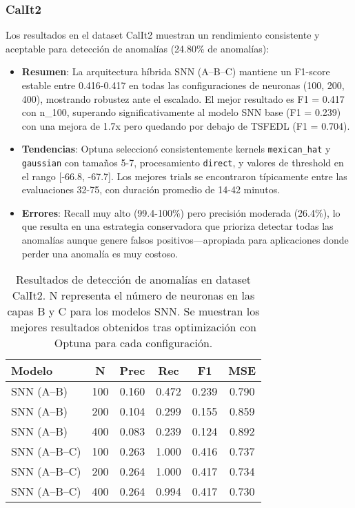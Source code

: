 \subsubsection{CalIt2}
Los resultados en el dataset CalIt2 muestran un rendimiento consistente y aceptable para detección de anomalías (24.80\% de anomalías):
\begin{itemize}
    \item \textbf{Resumen}: La arquitectura híbrida SNN (A--B--C) mantiene un F1-score estable entre 0.416-0.417 en todas las configuraciones de neuronas (100, 200, 400), mostrando robustez ante el escalado. El mejor resultado es F1 = 0.417 con n\_100, superando significativamente al modelo SNN base (F1 = 0.239) con una mejora de 1.7x pero quedando por debajo de TSFEDL (F1 = 0.704).
    \item \textbf{Tendencias}: Optuna seleccionó consistentemente kernels \texttt{mexican\_hat} y \texttt{gaussian} con tamaños 5-7, procesamiento \texttt{direct}, y valores de threshold en el rango [-66.8, -67.7]. Los mejores trials se encontraron típicamente entre las evaluaciones 32-75, con duración promedio de 14-42 minutos.
    \item \textbf{Errores}: Recall muy alto (99.4-100\%) pero precisión moderada (26.4\%), lo que resulta en una estrategia conservadora que prioriza detectar todas las anomalías aunque genere falsos positivos—apropiada para aplicaciones donde perder una anomalía es muy costoso.
\end{itemize}

\begin{table}[htbp]
\centering
\small
\begin{tabular}{lccccc}
\hline\hline
\textbf{Modelo} & \textbf{N} & \textbf{Prec} & \textbf{Rec} & \textbf{F1} & \textbf{MSE} \\
\hline
SNN (A--B) & 100 & 0.160 & 0.472 & 0.239 & 0.790 \\
SNN (A--B) & 200 & 0.104 & 0.299 & 0.155 & 0.859 \\
SNN (A--B) & 400 & 0.083 & 0.239 & 0.124 & 0.892 \\
\hline
SNN (A--B--C) & 100 & 0.263 & 1.000 & 0.416 & 0.737 \\
SNN (A--B--C) & 200 & 0.264 & 1.000 & 0.417 & 0.734 \\
SNN (A--B--C) & 400 & 0.264 & 0.994 & 0.417 & 0.730 \\
\hline\hline
\end{tabular}
\caption{Resultados de detección de anomalías en dataset CalIt2. N representa el número de neuronas en las capas B y C para los modelos SNN. Se muestran los mejores resultados obtenidos tras optimización con Optuna para cada configuración.}
\label{tab:resultados-iops-escalabilidad}
\end{table}


